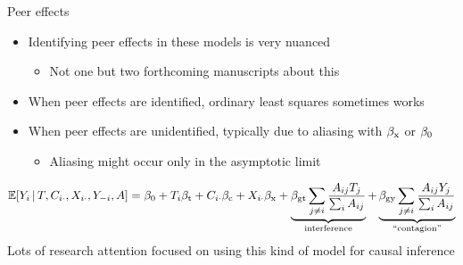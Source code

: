\documentclass[aspectratio=169]{beamer}
\theoremstyle{remark}
\begin{document}
\begin{frame}{Peer effects}
    \begin{itemize}
        \item Identifying peer effects in these models is very nuanced
              \begin{itemize}
                  \item Not one but two forthcoming manuscripts about this
              \end{itemize}
        \item When peer effects are identified, ordinary least squares sometimes works
        \item When peer effects are unidentified, typically due to aliasing with $\beta_\text{x}$ or $\beta_0$
              \begin{itemize}
                  \item Aliasing might occur only in the asymptotic limit
              \end{itemize}
    \end{itemize}
    \begin{equation*}
        \begin{aligned}
            \E[T, \C_{i \cdot}, \X_{i \cdot}, Y_{-i}, A]{Y_i}
            = \betazero + T_i \betat + \C_{i \cdot} \betac + \X_{i \cdot} \betax +
            \underbrace{\beta_\text{gt} \sum_{j \neq i} \frac{A_{ij} T_j}{\sum_i A_{ij}}}_\text{interference} +
            \underbrace{\beta_\text{gy} \sum_{j \neq i} \frac{A_{ij} Y_j}{\sum_i A_{ij}}}_\text{``contagion''}
        \end{aligned}
    \end{equation*}
    \vspace{2mm}
    Lots of research attention focused on using this kind of model for causal inference
\end{frame}
\end{document}
